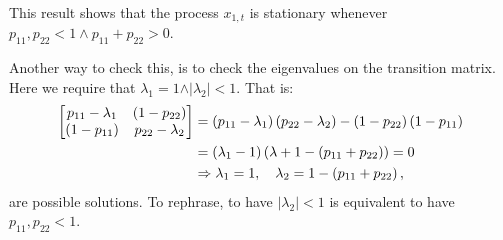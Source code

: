 \documentclass[11pt,a4paper,oneside]{article}
\newcommand{\lp}{\left(}
\newcommand{\rp}{\right)}
\begin{document}
This result shows that the process $x_{1,t}$ is stationary whenever $p_{11}, p_{22} < 1 \wedge p_{11} + p_{22} > 0$.

Another way to check this, is to check the eigenvalues on the transition matrix. Here we require that $\lambda_1 = 1 \wedge \vert \lambda_2 \vert < 1$. That is:
\begin{align}
    \begin{bmatrix} 
        p_{11} - \lambda_1 & \lp 1 - p_{22} \rp \\
        \lp 1 - p_{11} \rp & p_{22} - \lambda_2
    \end{bmatrix}
    &= \lp p_{11} - \lambda_1 \rp \lp p_{22} - \lambda_2\rp - \lp 1 - p_{22}\rp\lp 1 - p_{11}\rp \notag \\
    &= \lp \lambda_1 - 1\rp \lp  \lambda + 1 - \lp p_{11} + p_{22}\rp\rp = 0 \notag \\
    &\Rightarrow \lambda_1 = 1, \quad \lambda_2 = 1 - \lp p_{11} + p_{22}\rp,
\end{align} 
are possible solutions. To rephrase, to have $\vert \lambda_2\vert < 1$ is equivalent to have $p_{11}, p_{22} < 1$.
\end{document}
